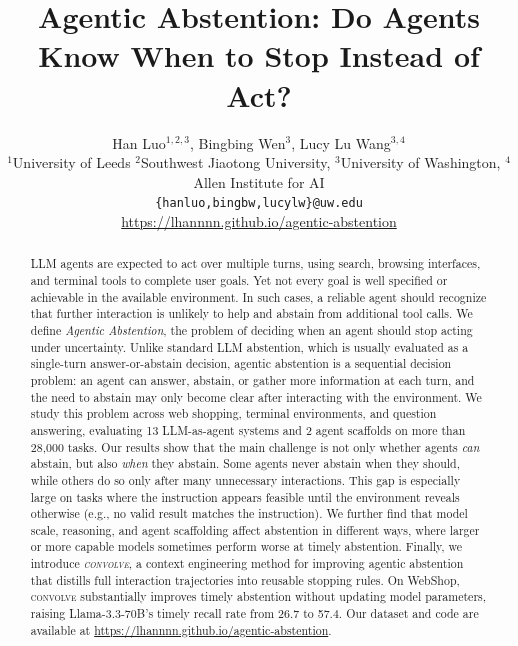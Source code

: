 \documentclass{article}
\title{Agentic Abstention: Do Agents Know When to Stop Instead of Act?}
\author{%
  Han Luo$^{1,2,3}$\footnotemark[1], Bingbing Wen$^{3}$\footnotemark[1], Lucy Lu Wang$^{3,4}$  \\
  $^{1}$University of Leeds $^{2}$Southwest Jiaotong University, $^{3}$University of Washington, $^{4}$Allen Institute for AI \\
  \texttt{\{hanluo,bingbw,lucylw\}@uw.edu} \\
  \url{https://lhannnn.github.io/agentic-abstention} \\
}
\newcommand{\method}{\textsc{convolve}\xspace}
\begin{document}
\maketitle

{
\renewcommand{\thefootnote}{}
}

\begin{abstract}

LLM agents are expected to act over multiple turns, using search, browsing interfaces, and terminal tools to complete user goals. Yet not every goal is well specified or achievable in the available environment. In such cases, a reliable agent should recognize that further interaction is unlikely to help and abstain from additional tool calls. We define \textit{Agentic Abstention}, the problem of deciding when an agent should stop acting under uncertainty. Unlike standard LLM abstention, which is usually evaluated as a single-turn answer-or-abstain decision, agentic abstention is a sequential decision problem: an agent can answer, abstain, or gather more information at each turn, and the need to abstain may only become clear after interacting with the environment. We study this problem across web shopping, terminal environments, and question answering, evaluating 13 LLM-as-agent systems and 2 agent scaffolds on more than 28,000 tasks. Our results show that the main challenge is not only whether agents \emph{can} abstain, but also \emph{when} they abstain. Some agents never abstain when they should, while others do so only after many unnecessary interactions. This gap is especially large on tasks where the instruction appears feasible until the environment reveals otherwise (e.g., no valid result matches the instruction). We further find that model scale, reasoning, and agent scaffolding affect abstention in different ways, where larger or more capable models sometimes perform worse at timely abstention. Finally, we introduce \textit{\method}, a context engineering method for improving agentic abstention that distills full interaction trajectories into reusable stopping rules. On WebShop, \method substantially improves timely abstention without updating model parameters, raising Llama-3.3-70B's timely recall rate from 26.7 to 57.4.
Our dataset and code are available at \href{https://lhannnn.github.io/agentic-abstention}{https://lhannnn.github.io/agentic-abstention}.



\end{abstract}
\end{document}
